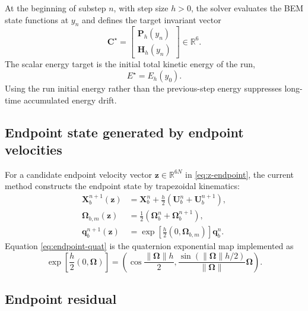 \documentclass[11pt,a4paper]{article}
\newcommand{\R}{\mathbb{R}}
\newcommand{\bX}{\bm{X}}
\newcommand{\bU}{\bm{U}}
\newcommand{\bOmega}{\bm{\Omega}}
\newcommand{\bP}{\bm{P}}
\newcommand{\bH}{\bm{H}}
\newcommand{\bC}{\bm{C}}
\newcommand{\bz}{\bm{z}}
\newcommand{\quat}[1]{\mathbf{#1}}
\begin{document}
At the beginning of substep $n$, with step size $h>0$, the solver evaluates the
BEM state functions at $y_n$ and defines the target invariant vector
\begin{equation}
  \bC^\star
  =
  \begin{bmatrix}
    \bP_h(y_n)\\
    \bH_h(y_n)
  \end{bmatrix}
  \in\R^6 .
  \label{eq:target-c}
\end{equation}
The scalar energy target is the initial total kinetic energy of the run,
\begin{equation}
  E^\star = E_h(y_0).
  \label{eq:target-energy}
\end{equation}
Using the run initial energy rather than the previous-step energy suppresses
long-time accumulated energy drift.

\subsection{Endpoint state generated by endpoint velocities}

For a candidate endpoint velocity vector $\bz\in\R^{6N}$ in
\eqref{eq:z-endpoint}, the
current method constructs the endpoint state by trapezoidal kinematics:
\begin{align}
  \bX_b^{n+1}(\bz)
  &=
  \bX_b^n
  +
  \frac{h}{2}
  \left(\bU_b^n+\bU_b^{n+1}\right),
  \label{eq:endpoint-position}\\
  \bOmega_{b,m}(\bz)
  &=
  \frac{1}{2}
  \left(\bOmega_b^n+\bOmega_b^{n+1}\right),
  \label{eq:endpoint-omega-mid}\\
  \quat{q}_b^{n+1}(\bz)
  &=
  \exp\!\left[
    \frac{h}{2}(0,\bOmega_{b,m})
  \right]\quat{q}_b^n .
  \label{eq:endpoint-quat}
\end{align}
Equation \eqref{eq:endpoint-quat} is the quaternion exponential map implemented
as
\begin{equation}
  \exp\!\left[\frac{h}{2}(0,\bOmega)\right]
  =
  \left(
    \cos\frac{\|\bOmega\|h}{2},
    \frac{\sin(\|\bOmega\|h/2)}{\|\bOmega\|}\bOmega
  \right).
\end{equation}

\subsection{Endpoint residual}
\end{document}

